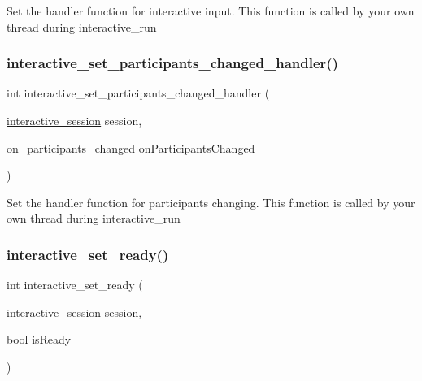 Set the handler function for interactive input. This function is called by your own thread during {\ttfamily interactive\+\_\+run} 

\mbox{\label{group___interactivity_gaa38200c346ef499a6c78a66b1c558e9d}} 
\subsubsection{\texorpdfstring{interactive\+\_\+set\+\_\+participants\+\_\+changed\+\_\+handler()}{interactive\_set\_participants\_changed\_handler()}}
{\footnotesize\ttfamily int interactive\+\_\+set\+\_\+participants\+\_\+changed\+\_\+handler (\begin{DoxyParamCaption}\item[{\mbox{\hyperlink{group___interactivity_ga6d8819d38b8dc8994a2299cf22a65a31}{interactive\+\_\+session}}}]{session,  }\item[{\mbox{\hyperlink{group___interactivity_ga37e53b2d79a8ef8dbb6adae640e53779}{on\+\_\+participants\+\_\+changed}}}]{on\+Participants\+Changed }\end{DoxyParamCaption})}



Set the handler function for participants changing. This function is called by your own thread during {\ttfamily interactive\+\_\+run} 

\mbox{\label{group___interactivity_ga4fd7e764e4381cb3b58ba7f7eb072bbc}} 
\subsubsection{\texorpdfstring{interactive\+\_\+set\+\_\+ready()}{interactive\_set\_ready()}}
{\footnotesize\ttfamily int interactive\+\_\+set\+\_\+ready (\begin{DoxyParamCaption}\item[{\mbox{\hyperlink{group___interactivity_ga6d8819d38b8dc8994a2299cf22a65a31}{interactive\+\_\+session}}}]{session,  }\item[{bool}]{is\+Ready }\end{DoxyParamCaption})}



